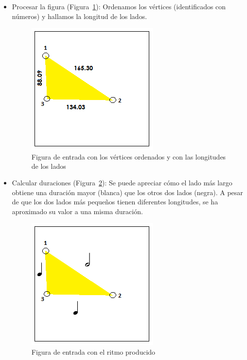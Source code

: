 \begin{itemize}

	\item Procesar la figura (Figura~\ref{fig:Figura1Voz1}): Ordenamos los vértices (identificados con números) y hallamos la longitud de los lados. \\

		\begin{figure}[htbp]
		\centering
		\hspace*{0.0in}
		\includegraphics[scale=1.0]{graphics/simpletest1-F1.png}
		\caption{Figura de entrada con los vértices ordenados y con las longitudes de los lados}
		\label{fig:Figura1Voz1}
		\end{figure}

	\item Calcular duraciones (Figura~\ref{fig:Figura2Voz1}): Se puede apreciar cómo el lado más largo obtiene una duración mayor (blanca) que los otros dos lados (negra). A pesar de que los dos lados más pequeños tienen diferentes longitudes, se ha aproximado su valor a una misma duración.\\
		
		\begin{figure}[htbp]
		\centering
		\hspace*{0.0in}
		\includegraphics[scale=1.0]{graphics/simpletest1-F2.png}
		\caption{Figura de entrada con el ritmo producido}
		\label{fig:Figura2Voz1}
		\end{figure}


\end{itemize}
